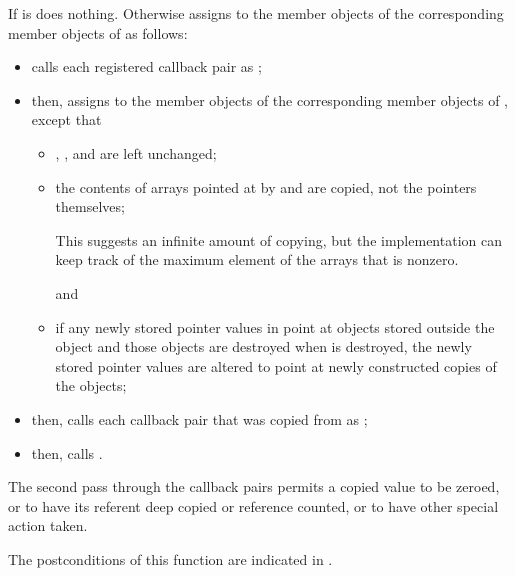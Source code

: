 \begin{itemdescr}
\pnum
\effects
If
 is 
does nothing.
Otherwise assigns to the member objects of
the corresponding member objects of  as follows:
\begin{itemize}
\item calls each registered callback pair  as
;

\item then, assigns to the member objects of  the corresponding member objects of
, except that
\begin{itemize}
\item {}, , and  are left unchanged;

\item the contents of arrays pointed at by  and  are copied,
not the pointers themselves;
\begin{footnote}
 This suggests an infinite amount of copying, but the implementation can keep
track of the maximum element of the arrays that is nonzero.
\end{footnote}
and

\item if any newly stored pointer values in  point at objects stored outside
the object  and those objects are destroyed when  is destroyed, the
newly stored pointer values are altered to point at newly constructed copies of the
objects;
\end{itemize}

\item then, calls each callback pair that was copied from  as
;

\item then, calls .
\end{itemize}

\pnum
\begin{note}
The second pass through the callback pairs permits a copied 
value to be zeroed, or to have its referent deep copied or reference counted, or to have
other special action taken.
\end{note}

\pnum
\ensures
The postconditions of this function are indicated in .


\end{itemdescr}

